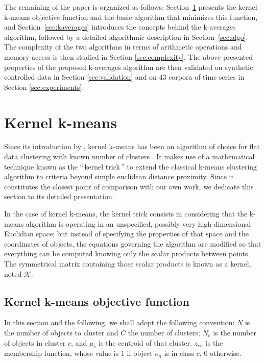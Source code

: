 \documentclass[natbib,smallextended]{svjour3}
\newcommand{\gl}[1]{``\,#1\,''} %
\begin{document}
The remaining of the paper is organized as follows: Section~\ref{sec:kkmeans} presents the kernel k-means objective function and the basic algorithm that minimizes this function, and Section~\ref{sec:kaverages} introduces the concepts behind the k-averages algorithm,
followed by a detailed algorithmic description in Section~\ref{sec:algo}.
The complexity of the two algorithms in terms of arithmetic operations and memory access is then studied in Section \ref{sec:complexity}. The above presented properties of the proposed k-averages algorithm are then validated on synthetic controlled data in Section \ref{sec:validation} and on 43 corpora of time series in Section \ref{sec:experiments}.

\section{Kernel k-means} \label{sec:kkmeans}

Since its introduction by \citet{Girolami:2002:MKC:2325785.2326903}, kernel k-means has been an algorithm of choice for flat data clustering with known number of clusters \citep{Kulis2008, Roth:2003:OCP:960254.960291}. It makes use of a mathematical technique known as the \gl{kernel trick} to extend the classical k-means clustering algorithm \citep{macQueenBsmsp67} to criteria beyond simple euclidean distance proximity. Since it constitutes the closest point of comparison with our own work, we dedicate this section to its detailed presentation.

In the case of kernel k-means, the kernel trick consists in considering that the k-means algorithm is operating in an unspecified, possibly very high-dimensional Euclidian space; but instead of specifying the properties of that space and the coordinates of objects, the equations governing the algorithm are modified so that everything can be computed knowing only the scalar products between points. The symmetrical matrix  containing those scalar products is known as a kernel, noted $\mathcal{K}$.

\subsection{Kernel k-means objective function}

In this section and the following, we shall adopt the following convention: $N$ is the number of objects to cluster and $C$ the number of clusters; $N_c$ is the number of objects in cluster $c$, and $\mu_c$ is the centroid of that cluster. $z_{cn}$ is the membership function, whose value is $1$ if object $o_n$ is in class $c$, $0$ otherwise.
\end{document}
